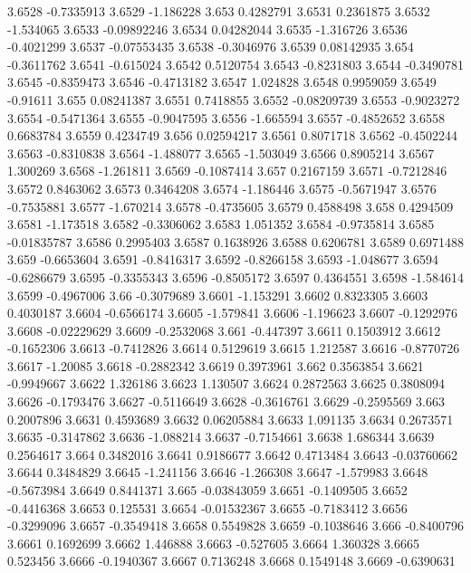 3.6528  -0.7335913
3.6529  -1.186228
3.653  0.4282791
3.6531  0.2361875
3.6532  -1.534065
3.6533  -0.09892246
3.6534  0.04282044
3.6535  -1.316726
3.6536  -0.4021299
3.6537  -0.07553435
3.6538  -0.3046976
3.6539  0.08142935
3.654  -0.3611762
3.6541  -0.615024
3.6542  0.5120754
3.6543  -0.8231803
3.6544  -0.3490781
3.6545  -0.8359473
3.6546  -0.4713182
3.6547  1.024828
3.6548  0.9959059
3.6549  -0.91611
3.655  0.08241387
3.6551  0.7418855
3.6552  -0.08209739
3.6553  -0.9023272
3.6554  -0.5471364
3.6555  -0.9047595
3.6556  -1.665594
3.6557  -0.4852652
3.6558  0.6683784
3.6559  0.4234749
3.656  0.02594217
3.6561  0.8071718
3.6562  -0.4502244
3.6563  -0.8310838
3.6564  -1.488077
3.6565  -1.503049
3.6566  0.8905214
3.6567  1.300269
3.6568  -1.261811
3.6569  -0.1087414
3.657  0.2167159
3.6571  -0.7212846
3.6572  0.8463062
3.6573  0.3464208
3.6574  -1.186446
3.6575  -0.5671947
3.6576  -0.7535881
3.6577  -1.670214
3.6578  -0.4735605
3.6579  0.4588498
3.658  0.4294509
3.6581  -1.173518
3.6582  -0.3306062
3.6583  1.051352
3.6584  -0.9735814
3.6585  -0.01835787
3.6586  0.2995403
3.6587  0.1638926
3.6588  0.6206781
3.6589  0.6971488
3.659  -0.6653604
3.6591  -0.8416317
3.6592  -0.8266158
3.6593  -1.048677
3.6594  -0.6286679
3.6595  -0.3355343
3.6596  -0.8505172
3.6597  0.4364551
3.6598  -1.584614
3.6599  -0.4967006
3.66  -0.3079689
3.6601  -1.153291
3.6602  0.8323305
3.6603  0.4030187
3.6604  -0.6566174
3.6605  -1.579841
3.6606  -1.196623
3.6607  -0.1292976
3.6608  -0.02229629
3.6609  -0.2532068
3.661  -0.447397
3.6611  0.1503912
3.6612  -0.1652306
3.6613  -0.7412826
3.6614  0.5129619
3.6615  1.212587
3.6616  -0.8770726
3.6617  -1.20085
3.6618  -0.2882342
3.6619  0.3973961
3.662  0.3563854
3.6621  -0.9949667
3.6622  1.326186
3.6623  1.130507
3.6624  0.2872563
3.6625  0.3808094
3.6626  -0.1793476
3.6627  -0.5116649
3.6628  -0.3616761
3.6629  -0.2595569
3.663  0.2007896
3.6631  0.4593689
3.6632  0.06205884
3.6633  1.091135
3.6634  0.2673571
3.6635  -0.3147862
3.6636  -1.088214
3.6637  -0.7154661
3.6638  1.686344
3.6639  0.2564617
3.664  0.3482016
3.6641  0.9186677
3.6642  0.4713484
3.6643  -0.03760662
3.6644  0.3484829
3.6645  -1.241156
3.6646  -1.266308
3.6647  -1.579983
3.6648  -0.5673984
3.6649  0.8441371
3.665  -0.03843059
3.6651  -0.1409505
3.6652  -0.4416368
3.6653  0.125531
3.6654  -0.01532367
3.6655  -0.7183412
3.6656  -0.3299096
3.6657  -0.3549418
3.6658  0.5549828
3.6659  -0.1038646
3.666  -0.8400796
3.6661  0.1692699
3.6662  1.446888
3.6663  -0.527605
3.6664  1.360328
3.6665  0.523456
3.6666  -0.1940367
3.6667  0.7136248
3.6668  0.1549148
3.6669  -0.6390631
